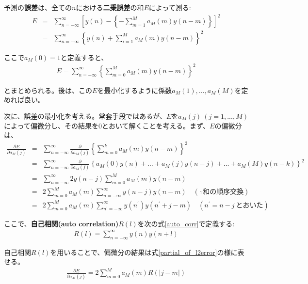 \documentclass[uplatex,dvipdfmx,b5j,10pt]{jsbook}
\theoremstyle{definition}
\begin{document}
予測の\textbf{誤差}は、全ての$n$における\textbf{二乗誤差}の和$E$によって測る:
\begin{eqnarray*}
  E &=& \sum_{n=-\infty}^{\infty} \left[ y(n) - \left\{ -\sum_{m=1}^{M} a_{M}(m) y(n-m) \right\} \right]^{2} \\
  &=& \sum_{n=-\infty}^{\infty} \left\{ y(n) + \sum_{i=1}^{M}a_{M}(m)y(n-m) \right\}^{2}
\end{eqnarray*}

ここで$a_{M}(0) = 1$と定義すると、
\begin{eqnarray}
  E = \sum_{n=-\infty}^{\infty} \left\{\sum_{m=0}^{M}a_{M}(m)y(n-m)\right\}^{2}
\end{eqnarray}

とまとめられる。後は、この$E$を最小化するように係数$a_{M}(1),...,a_{M}(M)$を定めれば良い。

次に、誤差の最小化を考える。常套手段ではあるが、$E$を$a_{M}(j) \ (j=1,...,M)$によって偏微分し、その結果を$0$とおいて解くことを考える。まず、$E$の偏微分は、
\begin{eqnarray*}
  \frac{\partial E}{\partial a_{M}(j)} &=& \sum_{n=-\infty}^{\infty} \frac{\partial}{\partial a_{M}(j)} \left\{\sum_{m=0}^{k}a_{M}(m)y(n-m) \right\}^{2} \\
  &=& \sum_{n=-\infty}^{\infty} \frac{\partial}{\partial a_{M}(j)} \left\{ a_{M}(0)y(n) + \dots + a_{M}(j)y(n-j) + \dots + a_{M}(M)y(n-k) \right\}^{2} \\
  &=& \sum_{n=-\infty}^{\infty} 2 y(n-j) \sum_{m=0}^{M} a_{M}(m) y(n-m) \\
  &=& 2 \sum_{m=0}^{M}a_{M}(m) \sum_{n=-\infty}^{\infty} y(n-j) y(n-m) \quad (\because 和の順序交換) \\
  &=& 2 \sum_{m=0}^{M}a_{M}(m) \sum_{n^{\prime}=-\infty}^{\infty} y(n^{\prime}) y(n^{\prime}+j-m) \quad (n^{\prime} = n-j \ とおいた)
\end{eqnarray*}

ここで、\textbf{自己相関(auto correlation)}$R(l)$を次の式\ref{auto_corr}で定義する:
\begin{eqnarray}
  R(l) = \sum_{n=-\infty}^{\infty} y(n) y(n+l) \label{auto_corr}
\end{eqnarray}

自己相関$R(l)$を用いることで、偏微分の結果は式\ref{partial_of_l2error}の様に表せる。
\begin{eqnarray}\label{partial_of_l2error}
  \frac{\partial E}{\partial a_{M}(j)} = 2 \sum_{m=0}^{M} a_{M}(m)R(|j-m|)
\end{eqnarray}
\end{document}
